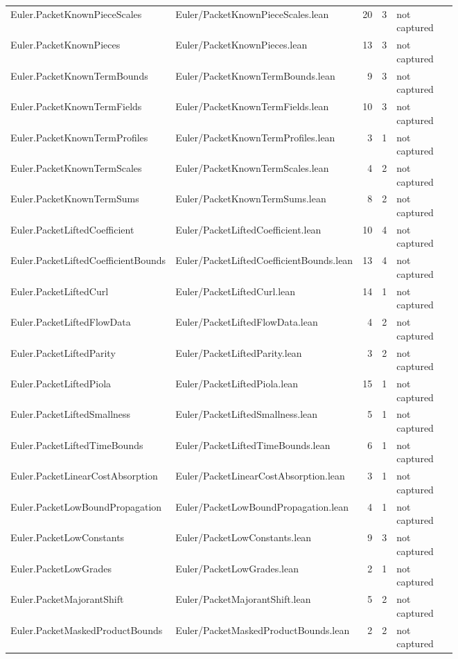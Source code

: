 \documentclass[10pt]{article}
\begin{document}
\begin{longtable}{p{0.28\linewidth}p{0.27\linewidth}r r p{0.20\linewidth}}
Euler.PacketKnownPieceScales & Euler/PacketKnownPieceScales.lean & 20 & 3 & not captured\\
Euler.PacketKnownPieces & Euler/PacketKnownPieces.lean & 13 & 3 & not captured\\
Euler.PacketKnownTermBounds & Euler/PacketKnownTermBounds.lean & 9 & 3 & not captured\\
Euler.PacketKnownTermFields & Euler/PacketKnownTermFields.lean & 10 & 3 & not captured\\
Euler.PacketKnownTermProfiles & Euler/PacketKnownTermProfiles.lean & 3 & 1 & not captured\\
Euler.PacketKnownTermScales & Euler/PacketKnownTermScales.lean & 4 & 2 & not captured\\
Euler.PacketKnownTermSums & Euler/PacketKnownTermSums.lean & 8 & 2 & not captured\\
Euler.PacketLiftedCoefficient & Euler/PacketLiftedCoefficient.lean & 10 & 4 & not captured\\
Euler.PacketLiftedCoefficientBounds & Euler/PacketLiftedCoefficientBounds.lean & 13 & 4 & not captured\\
Euler.PacketLiftedCurl & Euler/PacketLiftedCurl.lean & 14 & 1 & not captured\\
Euler.PacketLiftedFlowData & Euler/PacketLiftedFlowData.lean & 4 & 2 & not captured\\
Euler.PacketLiftedParity & Euler/PacketLiftedParity.lean & 3 & 2 & not captured\\
Euler.PacketLiftedPiola & Euler/PacketLiftedPiola.lean & 15 & 1 & not captured\\
Euler.PacketLiftedSmallness & Euler/PacketLiftedSmallness.lean & 5 & 1 & not captured\\
Euler.PacketLiftedTimeBounds & Euler/PacketLiftedTimeBounds.lean & 6 & 1 & not captured\\
Euler.PacketLinearCostAbsorption & Euler/PacketLinearCostAbsorption.lean & 3 & 1 & not captured\\
Euler.PacketLowBoundPropagation & Euler/PacketLowBoundPropagation.lean & 4 & 1 & not captured\\
Euler.PacketLowConstants & Euler/PacketLowConstants.lean & 9 & 3 & not captured\\
Euler.PacketLowGrades & Euler/PacketLowGrades.lean & 2 & 1 & not captured\\
Euler.PacketMajorantShift & Euler/PacketMajorantShift.lean & 5 & 2 & not captured\\
Euler.PacketMaskedProductBounds & Euler/PacketMaskedProductBounds.lean & 2 & 2 & not captured\\

\end{longtable}
\end{document}
